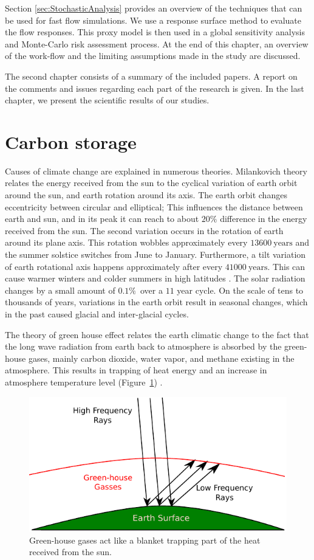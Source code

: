 Section \ref{sec:StochasticAnalysis} provides an overview of the techniques that can be used for fast flow simulations. We use a response surface
method to evaluate the flow responses. This proxy model is then used in a global sensitivity analysis and Monte-Carlo risk assessment process. At the end of this chapter, an overview of the work-flow and the limiting assumptions made in the study are discussed.

The second chapter consists of a summary of the included papers. A report on the comments and issues regarding each part of the research is given. In the last chapter, we present the scientific results of our studies.  

\section{Carbon storage}
\label{sec:CarbonStorage}
Causes of climate change are explained in numerous theories. Milankovich theory \cite{foukal2006variations} relates the energy received from the sun to the  cyclical variation of earth orbit around the sun, and earth rotation around its axis. The earth orbit changes eccentricity between circular and elliptical; This influences the distance between earth and sun, and  in its peak it can reach to about $20\%$ difference in the energy received
from the sun. The second variation occurs in the rotation of earth around its
plane axis. This rotation wobbles approximately every $13600~\mbox{years}$ and
the summer solstice switches from June to January. Furthermore, a tilt variation of
earth rotational axis happens approximately after every $41000~\mbox{years}$.
This can cause warmer winters and colder summers in high latitudes
\cite{foukal2006variations}. The solar radiation changes by a small amount of $0.1\%$~over a $11$ year cycle. On the scale of tens to thousands of years, variations in the earth orbit
result in seasonal changes, which in the past caused glacial and inter-glacial
cycles.

The theory of green house effect relates the earth climatic change to the fact
that the long wave radiation from earth back to atmosphere is absorbed by the
green-house gases, mainly carbon dioxide, water vapor, and methane existing in
the atmosphere. This results in trapping of heat energy and an increase in
atmosphere temperature level (Figure~\ref{fig:grHsGs})
\cite{foukal2006variations}.

\begin{figure}
  \centering
  \includegraphics[width=0.65 \linewidth]{./figurer/G-H_gasses} 
  \caption{Green-house gases act like a blanket trapping part of the heat received from
the sun.}
  \label{fig:grHsGs}
%
\end{figure}

